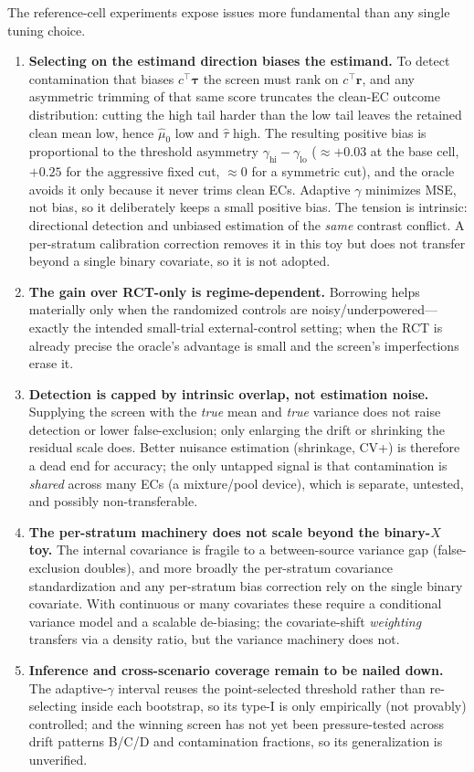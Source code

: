 \documentclass[11pt]{article}
\begin{document}
The reference-cell experiments expose issues more fundamental than any single tuning choice.
\begin{enumerate}
    \item \textbf{Selecting on the estimand direction biases the estimand.} To detect contamination that biases $c^{\top}\bm\tau$ the screen must rank on $c^{\top}\bm r$, and any asymmetric trimming of that same score truncates the clean-EC outcome distribution: cutting the high tail harder than the low tail leaves the retained clean mean low, hence $\widehat\mu_0$ low and $\widehat\tau$ high. The resulting positive bias is proportional to the threshold asymmetry $\gamma_{\mathrm{hi}}-\gamma_{\mathrm{lo}}$ ($\approx{+}0.03$ at the base cell, ${+}0.25$ for the aggressive fixed cut, $\approx0$ for a symmetric cut), and the oracle avoids it only because it never trims clean ECs. Adaptive $\gamma$ minimizes MSE, not bias, so it deliberately keeps a small positive bias. The tension is intrinsic: directional detection and unbiased estimation of the \emph{same} contrast conflict. A per-stratum calibration correction removes it in this toy but does not transfer beyond a single binary covariate, so it is not adopted.
    \item \textbf{The gain over RCT-only is regime-dependent.} Borrowing helps materially only when the randomized controls are noisy/underpowered---exactly the intended small-trial external-control setting; when the RCT is already precise the oracle's advantage is small and the screen's imperfections erase it.
    \item \textbf{Detection is capped by intrinsic overlap, not estimation noise.} Supplying the screen with the \emph{true} mean and \emph{true} variance does not raise detection or lower false-exclusion; only enlarging the drift or shrinking the residual scale does. Better nuisance estimation (shrinkage, CV+) is therefore a dead end for accuracy; the only untapped signal is that contamination is \emph{shared} across many ECs (a mixture/pool device), which is separate, untested, and possibly non-transferable.
    \item \textbf{The per-stratum machinery does not scale beyond the binary-$X$ toy.} The internal covariance is fragile to a between-source variance gap (false-exclusion doubles), and more broadly the per-stratum covariance standardization and any per-stratum bias correction rely on the single binary covariate. With continuous or many covariates these require a conditional variance model and a scalable de-biasing; the covariate-shift \emph{weighting} transfers via a density ratio, but the variance machinery does not.
    \item \textbf{Inference and cross-scenario coverage remain to be nailed down.} The adaptive-$\gamma$ interval reuses the point-selected threshold rather than re-selecting inside each bootstrap, so its type-I is only empirically (not provably) controlled; and the winning screen has not yet been pressure-tested across drift patterns B/C/D and contamination fractions, so its generalization is unverified.
\end{enumerate}
\end{document}
